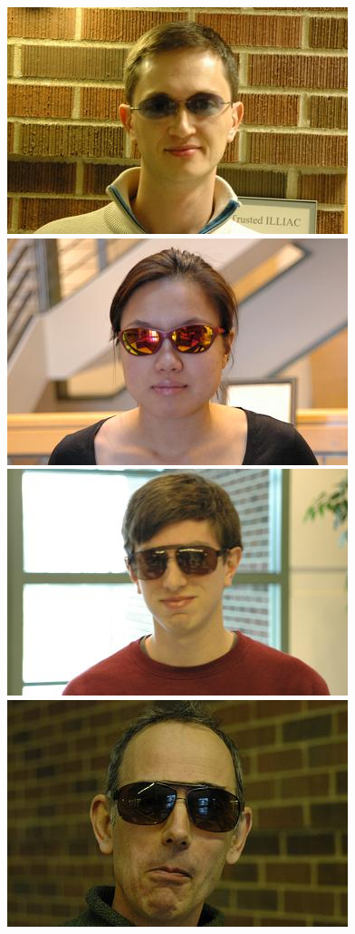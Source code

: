 \documentclass[12pt,journal,draftcls,letterpaper,onecolumn]{IEEEtran}
\begin{document}
\begin{figure}[t]
\centering
\includegraphics[scale=0.75,clip=true]{figures_pami/uiuc_example/sunglasses/DSC_1565.JPG}
\includegraphics[scale=0.75,clip=true]{figures_pami/uiuc_example/sunglasses/DSC_3656.JPG}
\includegraphics[scale=0.75,clip=true]{figures_pami/uiuc_example/sunglasses/DSC_3827.JPG}
\includegraphics[scale=0.75,clip=true]{figures_pami/uiuc_example/sunglasses/DSC_4090.JPG}

\end{figure}
\end{document}
